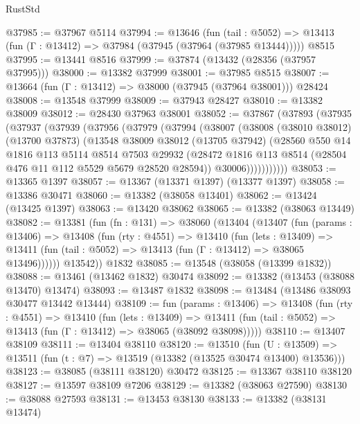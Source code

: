 \begin{lexlean}{RustStd}
\begin{coremodule}
@37985 := @37967 @5114
@37994 := @13646
    (fun (tail : @5052) => @13413 (fun (Γ : @13412) => @37984 (@37945 (@37964 (@37985 @13444)))))
    @8515
@37995 := @13441 @8516
@37999 := @37874 (@13432 (@28356 (@37957 @37995)))
@38000 := @13382 @37999
@38001 := @37985 @8515
@38007 := @13664 (fun (Γ : @13412) => @38000 (@37945 (@37964 @38001))) @28424
@38008 := @13548 @37999
@38009 := @37943 @28427
@38010 := @13382 @38009
@38012 := @28430 @37963 @38001
@38052 := @37867
    (@37893
      (@37935
        (@37937
          (@37939
            (@37956
              (@37979
                (@37994
                  (@38007
                    (@38008
                      (@38010 @38012)
                      (@13700 @37873)
                      (@13548
                        @38009
                        @38012
                        (@13705 @37942)
                        (@28560
                          @550
                          @14
                          @1816
                          @113
                          @5114
                          @8514
                          @7503
                          @29932
                          (@28472 @1816 @113 @8514 (@28504 @476 @11 @112 @5529 @5679 @28520 @28594))
                          @30006)))))))))))
@38053 := @13365 @1397
@38057 := @13367 (@13371 @1397) (@13377 @1397)
@38058 := @13386 @30471
@38060 := @13382 (@38058 @13401)
@38062 := @13424 (@13425 @1397)
@38063 := @13420 @38062
@38065 := @13382 (@38063 @13449)
@38082 := @13381
    (fun (fn : @131) =>
    @38060
      (@13404
        (@13407
          (fun (params : @13406) =>
          @13408
            (fun (rty : @4551) =>
            @13410
              (fun (lets : @13409) =>
              @13411 (fun (tail : @5052) => @13413 (fun (Γ : @13412) => @38065 @13496))))))
        @13542))
    @1832
@38085 := @13548 (@38058 (@13399 @1832))
@38088 := @13461 (@13462 @1832) @30474
@38092 := @13382 (@13453 (@38088 @13470) @13474)
@38093 := @13487 @1832
@38098 := @13484 (@13486 @38093 @30477 @13442 @13444)
@38109 := fun (params : @13406) =>
  @13408
    (fun (rty : @4551) =>
    @13410
      (fun (lets : @13409) =>
      @13411 (fun (tail : @5052) => @13413 (fun (Γ : @13412) => @38065 (@38092 @38098)))))
@38110 := @13407 @38109
@38111 := @13404 @38110
@38120 := @13510
    (fun (U : @13509) => @13511 (fun (t : @7) => @13519 (@13382 (@13525 @30474 @13400) @13536)))
@38123 := @38085 (@38111 @38120) @30472
@38125 := @13367 @38110 @38120
@38127 := @13597 @38109 @7206
@38129 := @13382 (@38063 @27590)
@38130 := @38088 @27593
@38131 := @13453 @38130
@38133 := @13382 (@38131 @13474)

\end{coremodule}
\end{lexlean}
